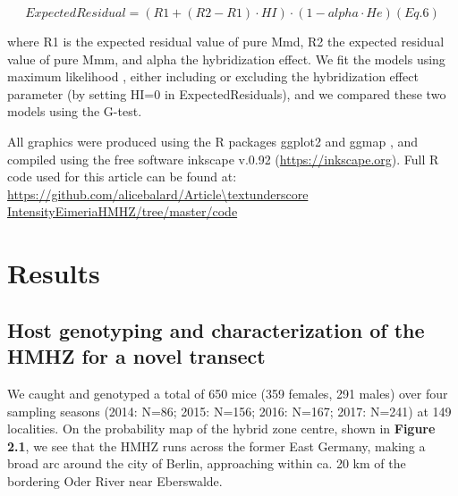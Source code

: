 \[ExpectedResidual=(R1 + (R2 − R1) · HI) · (1 − alpha · He) (Eq. 6) \]

where R1 is the expected residual value of pure Mmd, R2 the expected residual value of pure Mmm, and alpha the hybridization effect. We fit the models using maximum likelihood \parencite[using the R package mle2;][]{bolker_bbmle_2017}, either including or excluding the hybridization effect parameter (by setting HI=0 in ExpectedResiduals), and we compared these two models using the G-test. 
\par All graphics were produced using the R packages ggplot2 \citep{wickham_ggplot2_2016} and ggmap \citep{kahle_ggmap_2013}, and compiled using the free software inkscape v.0.92 (\url{https://inkscape.org}). Full R code used for this article can be found at:	 \url{https://github.com/alicebalard/Article\textunderscore IntensityEimeriaHMHZ/tree/master/code}

\section{Results}
\subsection{Host genotyping and characterization of the HMHZ for a novel transect}
We caught and genotyped a total of 650 mice (359 females, 291 males) over four sampling seasons (2014: N=86; 2015: N=156; 2016: N=167; 2017: N=241) at 149 localities. On the probability map of the hybrid zone centre, shown in \textbf{Figure 2.1}, we see that the HMHZ runs across the former East Germany, making a broad arc around the city of Berlin, approaching within ca. 20 km of the bordering Oder River near Eberswalde. 

